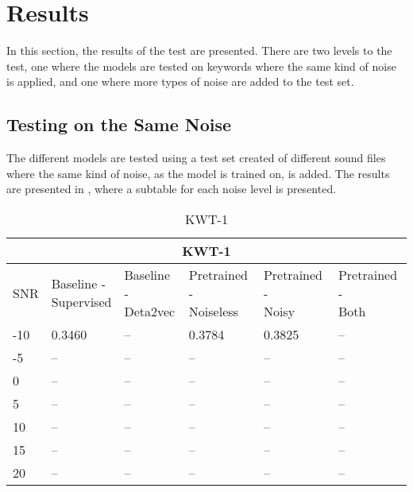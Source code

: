 \section{Results} \label{results}
In this section, the results of the test are presented. There are two levels to the test, one where the models are tested on keywords where the same kind of noise is applied, and one where more types of noise are added to the test set. 

\subsection{Testing on the Same Noise} \label{subsec:test1}
The different models are tested using a test set created of different sound files where the same kind of noise, as the model is trained on, is added. The results are presented in , where a subtable for each noise level is presented. 

\begin{table}[ht]
    \centering
    \begin{tabular}{@{}llllll@{}}
        \multicolumn{6}{c}{\textbf{KWT-1}}\\
        \toprule
        SNR    & \makecell{ Baseline - \\ Supervised } & \makecell{ Baseline - \\ Deta2vec } & \makecell{ Pretrained - \\ Noiseless } & \makecell{ Pretrained - \\ Noisy } & \makecell{ Pretrained - \\ Both } \\ \midrule
        -10  & 0.3460 & -- & 0.3784 & 0.3825 & -- \\
        -5   & -- & -- & -- & -- & -- \\
        0    & -- & -- & -- & -- & -- \\
        5    & -- & -- & -- & -- & -- \\
        10   & -- & -- & -- & -- & -- \\
        15   & -- & -- & -- & -- & -- \\
        20   & -- & -- & -- & -- & -- \\
        
        \bottomrule
    \end{tabular}
    \caption{KWT-1}
    \label{tab:KWT-1_snrmix_busxbbl}
\end{table}

